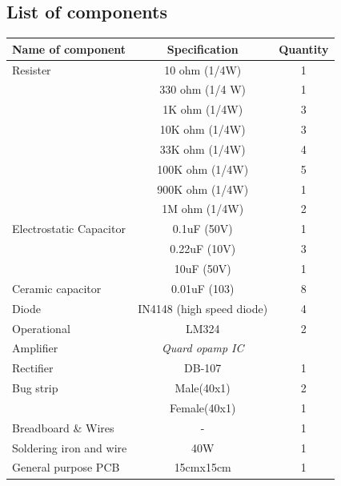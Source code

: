 \documentclass[a4paper,12pt,oneside]{book}
\begin{document}
\subsection*{List of components}
\begin{tabular}{|l|c|c|}
	\hline
	\textbf{Name of component} & \textbf{Specification}& \textbf{Quantity}\\ \hline
	Resister& 10 ohm (1/4W)&1\\ \hline
	&330 ohm (1/4 W)&1 \\ \cline{2-3}
	&1K ohm (1/4W)&3 \\ \cline{2-3}
	&10K ohm (1/4W)&3 \\ \cline{2-3}
	&33K ohm (1/4W)&4 \\ \cline{2-3}
	&100K ohm (1/4W)&5 \\ \cline{2-3}
	&900K ohm (1/4W)&1 \\ \cline{2-3}
	&1M ohm (1/4W)&2 \\ \hline
	Electrostatic Capacitor& 0.1uF (50V)&1\\ \cline{2-3}
	&0.22uF (10V)&3 \\ \cline{2-3}
	&10uF (50V)&1 \\ \hline
	Ceramic capacitor& 0.01uF (103)&8 \\\hline
	Diode&IN4148 (high speed diode)&4 \\\hline
	Operational& LM324&2\\
	Amplifier&\textit{Quard opamp IC}&\\\hline
	Rectifier&DB-107&1 \\\hline
	Bug strip&Male(40x1)&2 \\\cline{2-3}
	&Female(40x1)&1\\\hline
	Breadboard \& Wires & -&1 \\\hline
	Soldering iron and wire& 40W&1 \\\hline
	General purpose PCB & 15cmx15cm&1 \\\hline	
\end{tabular}
\\\\\\\\
\end{document}
